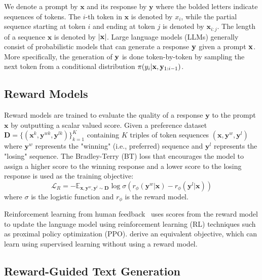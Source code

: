 We denote a prompt by $\mathbf{x}$ and its response by $\mathbf{y}$ where the bolded letters indicate sequences of tokens.
The $i$-th token in $\mathbf{x}$ is denoted by $x_i$, while the partial sequence starting at token $i$ and ending at token $j$ is denoted by $\mathbf{x}_{i:j}$.  
The length of a sequence $\mathbf{x}$ is denoted by $\vert \mathbf{x} \vert$. 
Large language models (LLMs) generally consist of probabilistic models that can generate a response ${\mathbf{y}}$ given a prompt ${\mathbf{x}}$.
More specifically, the generation of ${\mathbf{y}}$ is done token-by-token by sampling the next token from a conditional distribution $\pi(y_{i} | {\mathbf{x}},{\mathbf{y}}_{1:i-1})$.

\subsection{Reward Models}

Reward models are trained to evaluate the quality of a response $\mathbf{y}$ to the prompt $\mathbf{x}$ by outputting a scalar valued score.
Given a preference dataset \(\mathbf{D} = \{ (\mathbf{x}^k, \mathbf{y}^{wk}, \mathbf{y}^{lk}) \}_{k=1}^{K}\) containing \(K\) triples of token sequences \((\mathbf{x}, \mathbf{y}^w, \mathbf{y}^l)\) where $\mathbf{y}^w$ represents the "winning" (i.e., preferred) sequence and $\mathbf{y}^l$ represents the "losing" sequence. 
The Bradley-Terry (BT) loss \citep{bradleyterry1952paired} that encourages the model to assign a higher score to the winning response and a lower score to the losing response is used as the training objective:
%
\begin{equation} \label{eq:bradley-terry}
  \mathcal{L}_R = - \mathbb{E}_{\mathbf{x}, \mathbf{y}^w, \mathbf{y}^l \sim \mathbf{D}} \log \sigma ( r_{\phi} (\mathbf{y}^w|\mathbf{x}) - r_{\phi} (\mathbf{y}^l|\mathbf{x}))
\end{equation}
%
where \(\sigma\) is the logistic function and \(r_{\phi}\) is the reward model.

Reinforcement learning from human feedback~\citep[RLHF][]{ziegler2019rlhf, ouyang2022training} uses scores from the reward model to update the language model using reinforcement learning (RL) techniques such as proximal policy optimization (PPO). \citet{rafailov2023direct} derive an equivalent objective, which can learn using supervised learning without using a reward model. 

\subsection{Reward-Guided Text Generation}
\label{subsec:rgtg}

